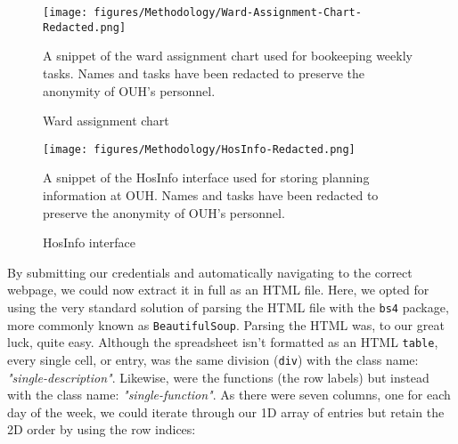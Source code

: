 \begin{figure}[H]
    \centering
    \texttt{[image: figures/Methodology/Ward-Assignment-Chart-Redacted.png]}
    \caption{Ward assignment chart}
    \small
    \raggedright 
    A snippet of the ward assignment chart used for bookeeping weekly tasks. Names and tasks have been redacted to preserve the anonymity of OUH's personnel. 
    \label{fig:wac-snippet}
\end{figure}

\begin{figure}[H]
    \centering
    \texttt{[image: figures/Methodology/HosInfo-Redacted.png]}
    \caption{HosInfo interface}
    \small
    \raggedright 
    A snippet of the HosInfo interface used for storing planning information at OUH. Names and tasks have been redacted to preserve the anonymity of OUH's personnel. 
    \label{fig:HosInfo-snippet}
\end{figure}

By submitting our credentials and automatically navigating to the correct webpage, we could now extract it in full as an HTML file. Here, we opted for using the very standard solution of parsing the HTML file with the \texttt{bs4} package, more commonly known as \texttt{BeautifulSoup}. Parsing the HTML was, to our great luck, quite easy. Although the spreadsheet isn't formatted as an HTML \texttt{table}, every single cell, or entry, was the same division (\texttt{div}) with the class name: \emph{"single-description"}. Likewise, were the functions (the row labels) but instead with the class name: \emph{"single-function"}. As there were seven columns, one for each day of the week, we could iterate through our 1D array of entries but retain the 2D order by using the row indices:

